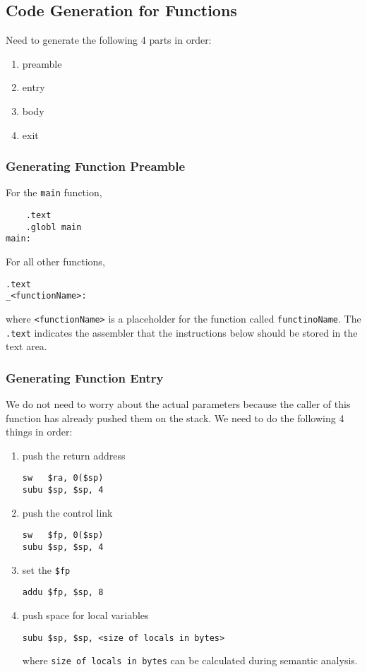 \documentclass[11pt]{article}
\begin{document}
\subsection{Code Generation for Functions}
\label{sec:org5ddf4cb}
Need to generate the following 4 parts in order:
\begin{enumerate}
\item preamble
\item entry
\item body
\item exit
\end{enumerate}
\subsubsection{Generating Function Preamble}
\label{sec:orgaa8e617}
For the \texttt{main} function,
\begin{verbatim}
    .text
    .globl main
main:
\end{verbatim}
For all other functions,
\begin{verbatim}
.text
_<functionName>:
\end{verbatim}
where \texttt{<functionName>} is a placeholder for the function called \texttt{functinoName}.
The \texttt{.text} indicates the assembler that the instructions below should be stored in the text area.
\subsubsection{Generating Function Entry}
\label{sec:orgf472759}
We do not need to worry about the actual parameters because the caller of this function has
already pushed them on the stack.
We need to do the following 4 things in order:
\begin{enumerate}
\item push the return address
\begin{verbatim}
sw   $ra, 0($sp)
subu $sp, $sp, 4
\end{verbatim}
\item push the control link
\begin{verbatim}
sw   $fp, 0($sp)
subu $sp, $sp, 4
\end{verbatim}
\item set the \texttt{\$fp}
\begin{verbatim}
addu $fp, $sp, 8
\end{verbatim}
\item push space for local variables
\begin{verbatim}
subu $sp, $sp, <size of locals in bytes>
\end{verbatim}
where \texttt{size of locals in bytes} can be calculated during semantic analysis.
\end{enumerate}
\end{document}
